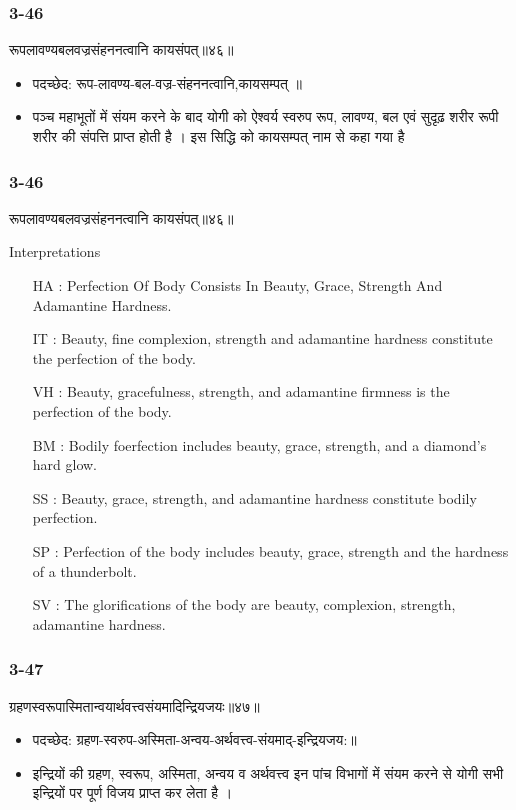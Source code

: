 \begin{frame}[fragile]\frametitle{3-46}
\begin{sanskrit}
रूपलावण्यबलवज्रसंहननत्वानि कायसंपत्॥४६॥
\end{sanskrit}

\begin{itemize}
\item पदच्छेद:  रूप-लावण्य-बल-वज्र-संहननत्वानि,कायसम्पत् ॥
\item पञ्च महाभूतों में संयम करने के बाद योगी को ऐश्वर्य स्वरुप रूप, लावण्य, बल एवं सुदृढ़ शरीर रूपी शरीर की संपत्ति प्राप्त होती है । इस सिद्धि को कायसम्पत् नाम से कहा गया है
\end{itemize}
\end{frame}


\begin{frame}[fragile]\frametitle{3-46}
\begin{sanskrit}
रूपलावण्यबलवज्रसंहननत्वानि कायसंपत्॥४६॥
\end{sanskrit}

Interpretations
\begin{itemize}	
\item [HA]: Perfection Of Body Consists In Beauty, Grace, Strength And Adamantine Hardness.
\item [IT]: Beauty, fine complexion, strength and adamantine hardness constitute the perfection of the body.
\item [VH]: Beauty, gracefulness, strength, and adamantine firmness is the perfection of the body.
\item [BM]: Bodily foerfection includes beauty, grace, strength, and a diamond’s hard glow.
\item [SS]: Beauty, grace, strength, and adamantine hardness constitute bodily perfection.
\item [SP]: Perfection of the body includes beauty, grace, strength and the hardness of a thunderbolt.
\item [SV]: The glorifications of the body are beauty, complexion, strength, adamantine hardness. 
\end{itemize}
\end{frame}



\begin{frame}[fragile]\frametitle{3-47}
\begin{sanskrit}
ग्रहणस्वरूपास्मितान्वयार्थवत्त्वसंयमादिन्द्रियजयः॥४७॥
\end{sanskrit}

\begin{itemize}
\item पदच्छेद:  ग्रहण-स्वरुप-अस्मिता-अन्वय-अर्थवत्त्व-संयमाद्-इन्द्रियजय:॥
\item  इन्द्रियों की ग्रहण, स्वरूप, अस्मिता, अन्वय व अर्थवत्त्व इन पांच विभागों में संयम करने से योगी सभी इन्द्रियों पर पूर्ण विजय प्राप्त कर लेता है ।
\end{itemize}
\end{frame}

